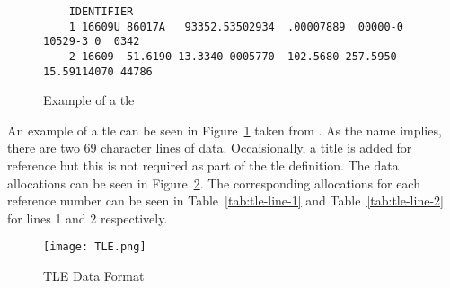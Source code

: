 \begin{figure}[h]
    \begin{verbatim}
    IDENTIFIER
    1 16609U 86017A   93352.53502934  .00007889  00000-0  10529-3 0  0342
    2 16609  51.6190 13.3340 0005770  102.5680 257.5950 15.59114070 44786
    \end{verbatim} 
    \caption{Example of a \gls{tle}}
    \label{fig:tle-ex} 
\end{figure}

An example of a \gls{tle} can be seen in Figure~\ref{fig:tle-ex} taken from
\cite{vallado_fundamentals_2001}.  As the name implies, there are two 69
character lines of data. Occaisionally, a title is added for reference but this
is not required as part of the \gls{tle} definition. The data allocations can
be seen in Figure~\ref{fig:tle-legend}. The corresponding allocations for each
reference number can be seen in Table~\ref{tab:tle-line-1} and
Table~\ref{tab:tle-line-2} for lines 1 and 2 respectively.

\begin{figure}[h]
    \centering
    \texttt{[image: TLE.png]} 
    \caption{TLE Data Format}
    \label{fig:tle-legend} 
\end{figure}


